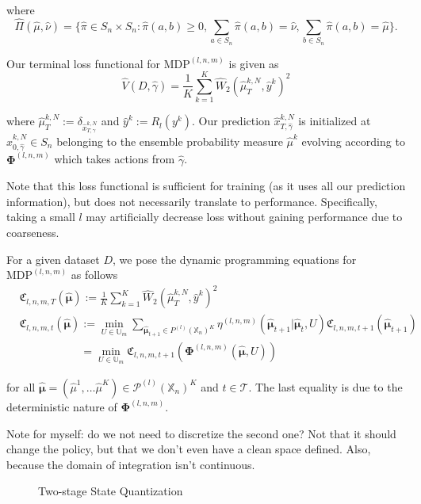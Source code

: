 \documentclass{article}
\begin{document}
where $$\hat \Pi (\hat \mu, \hat \nu) = \{\hat \pi \in S_n \times S_n : \hat \pi (a,b) \geq 0, \sum _ {a \in S_n} \hat \pi (a, b) = \hat \nu, \sum _ {b \in S_n} \hat \pi (a, b) = \hat \mu\}.$$ 

Our terminal loss functional for $\text{MDP}^{(l, n, m)}$ is given as 
$$\hat V(D, \hat \gamma) = \frac{1}{K}\sum _{k = 1}^K \hat W_{2}(\hat \mu^{k, N}_T ,\hat y^k)^2$$

where $\hat \mu^{k, N}_T := \delta_{\hat x^{k, N}_{T, \gamma}}$ and $\hat y^k := R_l(y^k)$. Our prediction $\hat x^{k, N}_{T, \hat \gamma}$ is initialized at $\hat x^{k, N}_{0, \hat \gamma} \in S_n$ belonging to the ensemble probability measure $\hat \mu^k$ evolving according to $\bm{\Phi}^{(l, n, m)}$ which takes actions from $\hat \gamma$. 

Note that this loss functional is sufficient for training (as it uses all our prediction information), but does not necessarily translate to performance. Specifically, taking a small $l$ may artificially decrease loss without gaining performance due to coarseness. 

For a given dataset $D$, we pose the dynamic programming equations for $\text{MDP}^{(l, n, m)}$ as follows
$$
\begin{aligned} & \mathfrak C _ {l, n, m, T} (\hat {\bm \mu}) := \frac{1}{K}\sum _{k = 1}^K \hat W_{2}(\hat \mu^{k, N}_T ,\hat y^k)^2\\
&\mathfrak C _ {l, n, m, t} (\hat {\bm \mu}) := \min_{U \in \mathbb U_m} \sum _{\hat{\bm \mu}_{t +1} \in P^{(l)}(\mathbb X_n)^K} \eta^{(l, n, m)}(\hat{\bm \mu}_{t + 1}| \hat{\bm \mu}_t, U)\mathfrak C _ {l, n, m, t + 1} (\hat{\bm \mu}_{t + 1})\\
&\phantom{\mathfrak C _ {l, n, m, t} (\hat {\bm \mu})}= \min_{U \in \mathbb U_m} \mathfrak C _ {l, n, m, t+1} (\bm \Phi ^{(l, n, m)}(\hat {\bm \mu}, U))
\end{aligned}
$$

for all $\hat{\bm \mu} = (\hat \mu ^1, \dots \hat \mu ^K)\in \mathcal P^{(l)}(\mathbb X _n)^K$ and $t \in \mathcal T$. The last equality is due to the deterministic nature of $\bm \Phi ^{(l, n, m)}$.

Note for myself: do we not need to discretize the second one? Not that it should change the policy, but that we don't even have a clean space defined. Also, because the domain of integration isn't continuous. 

\begin{figure}
    \centering
    \caption{Two-stage State Quantization}
    \label{fig:quantization}
\end{figure}
\end{document}
